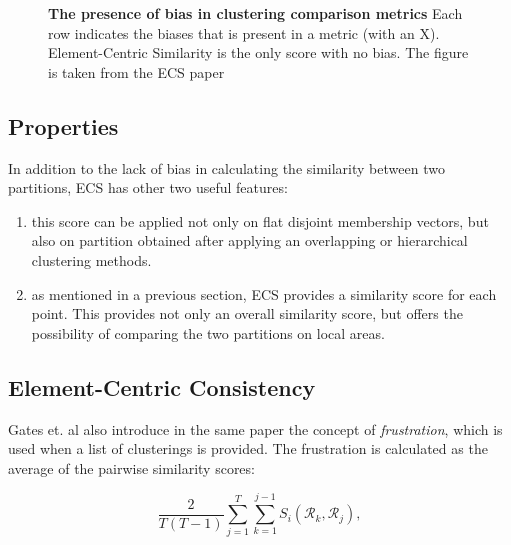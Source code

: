 \begin{figure}[H]
    \centering
    \caption{\label{fig:bias-comp}\textbf{The presence of bias in clustering comparison metrics} Each row indicates the biases that is present in a metric (with an X). Element-Centric Similarity is the only score with no bias. The figure is taken from the ECS paper \cite{Gates2019}}
\end{figure}

    \subsection{Properties}
    In addition to the lack of bias in calculating the similarity between two partitions, ECS has other two useful features:

    \begin{enumerate}
        \item this score can be applied not only on flat disjoint membership vectors, but also on partition obtained after applying an overlapping or hierarchical clustering methods.
        \item as mentioned in a previous section, ECS provides a similarity score for each point. This provides not only an overall similarity score, but offers the possibility of comparing the two partitions on local areas. 
    \end{enumerate}
    
    \subsection{Element-Centric Consistency}
    Gates et. al also introduce in the same paper the concept of \textit{frustration}, which is used when a list of clusterings is provided. The frustration is calculated as the average of the pairwise similarity scores:

    \[ \frac{2}{T(T-1)} \sum_{j=1}^T \sum_{k=1}^{j-1} S_i (\mathcal{R}_k, \mathcal{R}_j), \]

